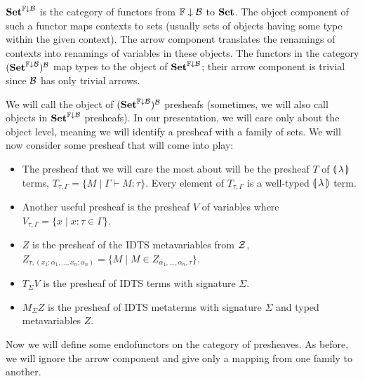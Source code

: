 $\mathbf{Set}^{\mathbb{F}\downarrow\mathcal{B}}$ is the category of functors from ${\mathbb{F}\downarrow\mathcal{B}}$ to
$\mathbf{Set}$. The object component of such a functor maps contexts to sets
(usually sets of objects having some type within the given context). The
arrow component translates the renamings of contexts into renamings of
variables in these objects. The functors in the category
$(\mathbf{Set}^{\mathbb{F}\downarrow\mathcal{B}})^{\mathcal{B}}$ map types to the object of $\mathbf{Set}^{\mathbb{F}\downarrow\mathcal{B}}$; their
arrow component is trivial since $\mathcal{B}$ has only trivial arrows.

We will call the object of $(\mathbf{Set}^{\mathbb{F}\downarrow\mathcal{B}})^{\mathcal{B}}$ presheafs (sometimes, we
will also call objects in $\mathbf{Set}^{\mathbb{F}\downarrow\mathcal{B}}$ presheafs). In our
presentation, we will care only about the object level, meaning we will
identify a presheaf with a family of sets. We will now consider some
presheaf that will come into play:

\begin{itemize}
\item The presheaf that we will care the most about will be the presheaf
  $T$ of $\llparenthesis \, \lambda \, \rrparenthesis$ terms,
  $T_{\tau,\Gamma} = \{ M \mid \Gamma \vdash M : \tau \}$. Every element of
  $T_{\tau,\Gamma}$ is a well-typed $\llparenthesis \, \lambda \, \rrparenthesis$ term.
\item Another useful presheaf is the presheaf $V$ of variables where
  $V_{\tau,\Gamma} = \{x \mid x : \tau \in \Gamma \}$.
\item $Z$ is the presheaf of the IDTS metavariables from $\mathcal{Z}$,
  $Z_{\tau, (x_1 : \alpha_1,\ldots,x_n : \alpha_n)} = \{ M \mid M \in
  Z_{\alpha_1,\ldots,\alpha_n,\tau} \}$.
\item $T_\Sigma V$ is the presheaf of IDTS terms with signature $\Sigma$.
\item $M_\Sigma
  Z$ is the presheaf of IDTS metaterms with signature
  $\Sigma$ and typed metavariables $Z$.
\end{itemize}

Now we will define some endofunctors on the category of presheaves. As
before, we will ignore the arrow component and give only a mapping from one
family to another.

